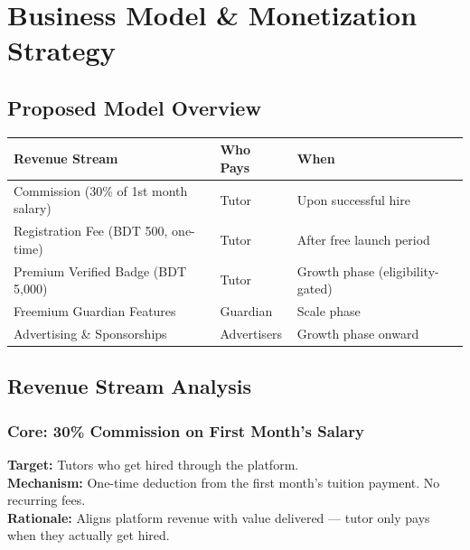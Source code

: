 \documentclass[12pt,a4paper,twoside]{report}
\begin{document}
\chapter{Business Model \& Monetization Strategy}

\section{Proposed Model Overview}

\begin{longtable}{p{4cm}|p{4cm}|p{4cm}}
\toprule
\textbf{Revenue Stream} & \textbf{Who Pays} & \textbf{When} \\
\midrule
\endhead
\bottomrule
\endfoot
Commission (30\% of 1st month salary) & Tutor & Upon successful hire \\
Registration Fee (BDT 500, one-time)   & Tutor & After free launch period \\
Premium Verified Badge (BDT 5,000)    & Tutor & Growth phase (eligibility-gated) \\
Freemium Guardian Features            & Guardian & Scale phase \\
Advertising \& Sponsorships           & Advertisers & Growth phase onward \\
\bottomrule
\end{longtable}

\section{Revenue Stream Analysis}

\subsection{Core: 30\% Commission on First Month's Salary}

\textbf{Target:} Tutors who get hired through the platform. \\
\textbf{Mechanism:} One-time deduction from the first month's tuition payment. No recurring fees. \\
\textbf{Rationale:} Aligns platform revenue with value delivered — tutor only pays when they actually get hired.
\end{document}
